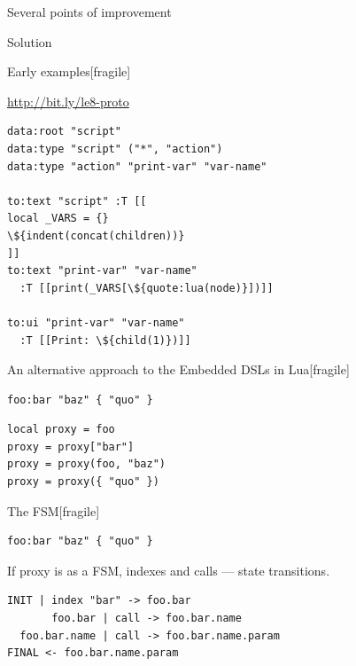\documentclass[handout]{beamer}
\begin{document}
\begin{frame}{Several points of improvement}
\begin{frame}{Solution}
\end{frame}


\begin{frame}{Early examples}[fragile]

\url{http://bit.ly/le8-proto}

\begin{verbatim}
data:root "script"
data:type "script" ("*", "action")
data:type "action" "print-var" "var-name"

to:text "script" :T [[
local _VARS = {}
\${indent(concat(children))}
]]
to:text "print-var" "var-name"
  :T [[print(_VARS[\${quote:lua(node)}])]]

to:ui "print-var" "var-name"
  :T [[Print: \${child(1)})]]
\end{verbatim}

\end{frame}


\begin{frame}{An alternative approach to the Embedded DSLs in Lua}[fragile]

\begin{verbatim}
foo:bar "baz" { "quo" }
\end{verbatim}

\begin{verbatim}
local proxy = foo
proxy = proxy["bar"]
proxy = proxy(foo, "baz")
proxy = proxy({ "quo" })
\end{verbatim}

\end{frame}


\begin{frame}{The FSM}[fragile]

\begin{verbatim}
foo:bar "baz" { "quo" }
\end{verbatim}

If proxy is as a FSM, indexes and calls — state transitions.

\begin{verbatim}
INIT | index "bar" -> foo.bar
       foo.bar | call -> foo.bar.name
  foo.bar.name | call -> foo.bar.name.param
FINAL <- foo.bar.name.param
\end{verbatim}


\end{frame}
\end{frame}
\end{document}
